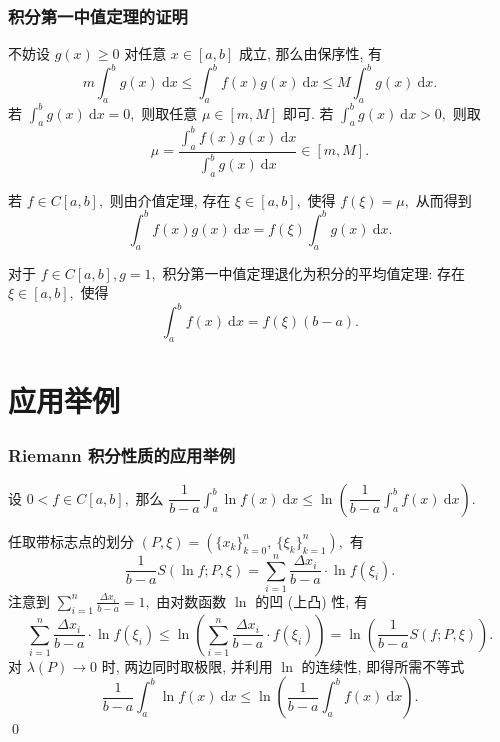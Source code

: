 
\begin{frame}
\frametitle{积分第一中值定理的证明}

不妨设 $g(x) \geqslant 0$ 对任意 $x \in [a, b]$ 成立, 那么由保序性, 有
\[
m \int_a^b g(x) ~ \mathrm{d} x \leqslant \int_a^b f(x) g(x) ~ \mathrm{d} x \leqslant M \int_a^b g(x) ~ \mathrm{d} x.
\]
若 $\int_a^b g(x) ~ \mathrm{d} x = 0,$ 则取任意 $\mu \in [m, M]$ 即可. 若 $\int_a^b g(x) ~ \mathrm{d} x > 0,$ 则取
\[\mu = \frac{\int_a^b f(x) g(x) ~ \mathrm{d} x}{\int_a^b g(x) ~ \mathrm{d} x} \in [m, M].\]

\pause
\vspace{0.5em}

若 $f \in C[a, b],$ 则由介值定理, 存在 $\xi \in [a, b],$ 使得 $f(\xi) = \mu,$ 从而得到
\[\int_a^b f(x) g(x) ~ \mathrm{d} x = f(\xi) \int_a^b g(x) ~ \mathrm{d} x.\]

\pause

\begin{remark}
对于 $f \in C[a, b], g = 1,$ 积分第一中值定理退化为积分的平均值定理: 存在 $\xi \in [a, b],$ 使得
\[\int_a^b f(x) ~ \mathrm{d} x = f(\xi) (b - a).\]
\end{remark}

\end{frame}


\section{应用举例}


\begin{frame}
\frametitle{Riemann 积分性质的应用举例}

\begin{eg}
设 $0 < f \in C[a, b],$ 那么 $\dfrac{1}{b - a} \int_a^b \ln f(x) ~ \mathrm{d} x \leqslant \ln \left( \dfrac{1}{b - a} \int_a^b f(x) ~ \mathrm{d} x \right).$
\end{eg}

\startproof[bg=yellow, fg=red]
任取带标志点的划分 $(P, \xi) = (\{x_k\}_{k=0}^n,\ \{\xi_k\}_{k=1}^n),$ 有
\[
\dfrac{1}{b - a} S(\ln f; P, \xi) = \sum_{i=1}^n \frac{\Delta x_i}{b - a} \cdot \ln f(\xi_i).
\]
注意到 $\sum_{i=1}^n \frac{\Delta x_i}{b - a} = 1,$ 由对数函数 $\ln$ 的凹 (上凸) 性, 有
\[
\sum_{i=1}^n \frac{\Delta x_i}{b - a} \cdot \ln f(\xi_i) \leqslant \ln \left( \sum_{i=1}^n \frac{\Delta x_i}{b - a} \cdot f(\xi_i) \right) = \ln \left( \frac{1}{b - a} S(f; P, \xi) \right).
\]
对 $\lambda(P) \to 0$ 时, 两边同时取极限, 并利用 $\ln$ 的连续性, 即得所需不等式
\[
\dfrac{1}{b - a} \int_a^b \ln f(x) ~ \mathrm{d} x \leqslant \ln \left( \dfrac{1}{b - a} \int_a^b f(x) ~ \mathrm{d} x \right).
\]
\qed

\end{frame}

